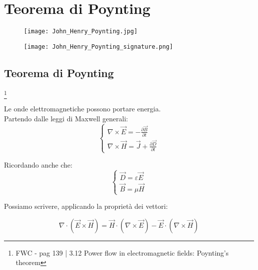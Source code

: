 \chapter{Teorema di Poynting} 

\begin{figure}[h]
    \centering
    \texttt{[image: John\_Henry\_Poynting.jpg]}
\end{figure} 

\begin{figure}[h]
    \centering 
    \texttt{[image: John\_Henry\_Poynting\_signature.png]}
\end{figure} 

\newpage 

\section{Teorema di Poynting} 

\footnote{FWC - pag 139 | 3.12 Power flow in electromagnetic fields: Poynting's theorem }

Le onde elettromagnetiche possono portare energia. \\ 

Partendo dalle leggi di Maxwell generali: \\ 

{\Large \begin{equation}
    \begin{cases}
        \nabla \times \vec{E} = - \frac{\partial \vec{B}}{\partial t} \\ 
        \nabla \times \vec{H} = \vec{J} + \frac{\partial \vec{D}}{\partial t}
    \end{cases}
\end{equation}}

Ricordando anche che: \\ 

{\Large \begin{equation}
    \begin{cases}
        \vec{D} = \varepsilon\vec{E} \\ 
        \vec{B} = \mu \vec{H} 
    \end{cases}
\end{equation}} 

Possiamo scrivere, applicando la proprietà dei vettori: 

{
    \Large
    \begin{equation}
    \nabla \cdot (\vec{E} \times \vec{H}) = \vec{H} \cdot (\nabla \times \vec{E}) - \vec{E} \cdot (\nabla \times \vec{H})     
    \end{equation}
}

